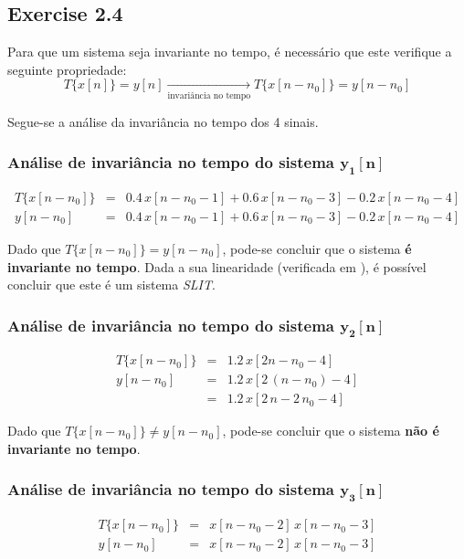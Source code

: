 \documentclass[a4paper]{article}
\begin{document}
\subsection{Exercise 2.4}
\noindent Para que um sistema seja invariante no tempo, é necessário que este verifique a seguinte propriedade:
\[
	T\{x[n]\} = y[n]
	\xrightarrow[\text{invariância no tempo}]{}
	T\{x[n - n_{0}]\} = y[n - n_{0}]
\]

Segue-se a análise da invariância no tempo dos 4 sinais.

\subsubsection{Análise de invariância no tempo do sistema $\mathbf{y_{1}[n]}$}
\begin{eqnarray}
	T\{x[n - n_{0}]\}	& = & 0.4 \, x[n - n_{0} - 1] + 0.6 \, x[n - n_{0} - 3] - 0.2 \, x[n - n_{0} - 4] \\
	y[n - n_ {0}]		& = & 0.4 \, x[n - n_{0} - 1] + 0.6 \, x[n - n_{0} - 3] - 0.2 \, x[n - n_{0} - 4]
\end{eqnarray}

\noindent Dado que $T\{x[n - n_{0}]\} = y[n - n_ {0}]$, pode-se concluir que o sistema \textbf{é invariante no tempo}. Dada a sua linearidade (verificada em \emph{}), é possível concluir que este é um sistema \emph{SLIT}.

\subsubsection{Análise de invariância no tempo do sistema $\mathbf{y_{2}[n]}$}
\begin{eqnarray}
	T\{x[n - n_{0}]\}	& = & 1.2 \, x[2n - n_{0} - 4] \\
	y[n - n_ {0}]		& = & 1.2 \, x[2 \, (n - n_{0}) - 4] \\
						& = & 1.2 \, x[2 \, n - 2 \, n_{0} - 4]
\end{eqnarray}

\noindent Dado que $T\{x[n - n_{0}]\} \neq y[n - n_ {0}]$, pode-se concluir que o sistema \textbf{não é invariante no tempo}.

\subsubsection{Análise de invariância no tempo do sistema $\mathbf{y_{3}[n]}$}
\begin{eqnarray}
	T\{x[n - n_{0}]\}	& = & x[n - n_{0} - 2] \, x[n - n_{0} - 3] \\
	y[n - n_ {0}]		& = & x[n - n_{0} - 2] \, x[n - n_{0} - 3]
\end{eqnarray}
\end{document}
